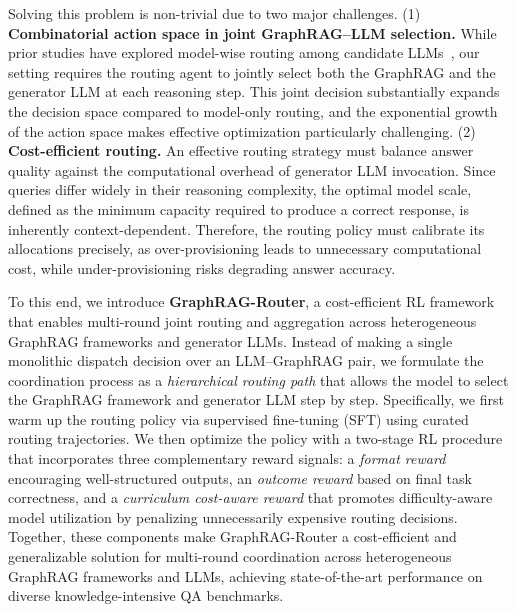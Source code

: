 Solving this problem is non-trivial due to two major challenges. (1) \textbf{Combinatorial action space in joint GraphRAG--LLM selection.} While prior studies have explored model-wise routing among candidate LLMs~\cite{Router-R1,KNNRouter}, our setting requires the routing agent to jointly select both the GraphRAG  and the generator LLM at each reasoning step. This joint decision substantially expands the decision space compared to model-only routing, and the exponential growth of the action space makes effective optimization particularly challenging.
(2) \textbf{Cost-efficient routing.}
An effective routing strategy must balance answer quality against the computational overhead of generator LLM invocation.
Since queries differ widely in their reasoning complexity, the optimal model scale, defined as the minimum capacity required to produce a correct response, is inherently context-dependent. Therefore, the routing policy must calibrate its allocations precisely, as over-provisioning leads to unnecessary computational cost, while under-provisioning risks degrading answer accuracy.

To this end, we introduce \textbf{GraphRAG-Router}, a cost-efficient RL framework that enables multi-round joint routing and aggregation across heterogeneous GraphRAG frameworks and generator LLMs. Instead of making a single monolithic dispatch decision over an LLM--GraphRAG pair, we formulate the coordination process as a \textit{hierarchical routing path} that allows the model to select the GraphRAG framework and generator LLM step by step.
Specifically, we first warm up the routing policy via supervised fine-tuning (SFT) using curated routing trajectories. We then optimize the policy with a two-stage RL procedure that incorporates three complementary reward signals: a \textit{format reward} encouraging well-structured outputs, an \textit{outcome reward} based on final task correctness, and a \textit{curriculum cost-aware reward} that promotes difficulty-aware model utilization by penalizing unnecessarily expensive routing decisions. Together, these components make GraphRAG-Router a cost-efficient and generalizable solution for multi-round coordination across heterogeneous GraphRAG frameworks and LLMs, achieving state-of-the-art performance on diverse knowledge-intensive QA benchmarks.

